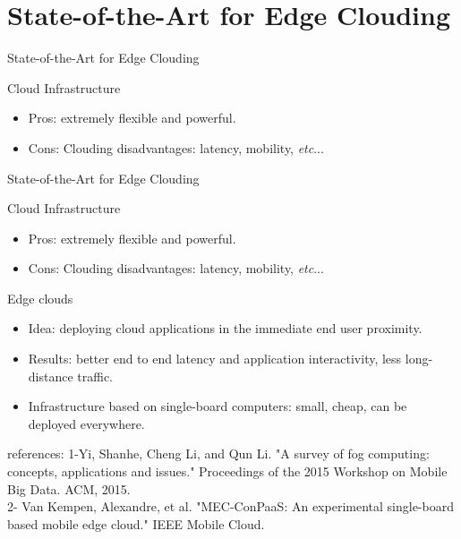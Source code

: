 \documentclass{beamer}
\begin{document}
\section{State-of-the-Art for Edge Clouding}

\begin{frame}{State-of-the-Art for Edge Clouding}

\begin{block}{Cloud Infrastructure}
    \begin{itemize}
    \item  Pros: extremely flexible and powerful.
    \item<2->  Cons: Clouding disadvantages: latency, mobility, {\em etc}...

    \end{itemize}
    \end{block}

\end{frame}

\begin{frame}{State-of-the-Art for Edge Clouding}

\begin{block}{Cloud Infrastructure}
    \begin{itemize}
    \item  Pros: extremely flexible and powerful.
    \item  Cons: Clouding disadvantages: latency, mobility, {\em etc}...

    \end{itemize}
    \end{block}

\begin{block}{Edge clouds}
    \begin{itemize}
    \item Idea: deploying cloud applications in the immediate end user proximity.
    \item<2-> Results: better end to end latency and application interactivity, less long-distance traffic.
     \item<3-> Infrastructure based on single-board computers: small, cheap, can  be deployed everywhere.
   
    \end{itemize}
    \end{block}
 {\tiny *references: 1-Yi, Shanhe, Cheng Li, and Qun Li. "A survey of fog computing: concepts, applications and issues." Proceedings of the 2015 Workshop on Mobile Big Data. ACM, 2015.\\
2- Van Kempen, Alexandre, et al. "MEC-ConPaaS: An experimental single-board based mobile edge cloud." IEEE Mobile Cloud.}

\end{frame}
\end{document}
